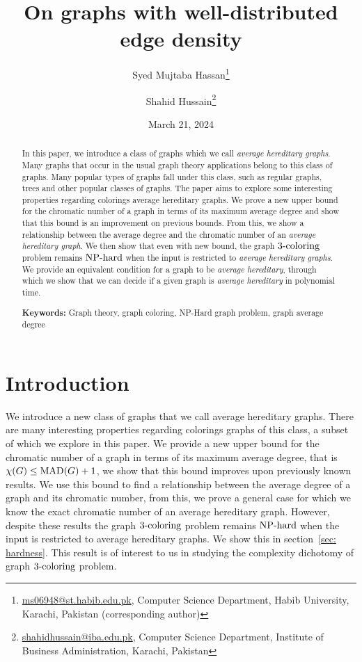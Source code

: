\documentclass{article}
\newcommand{\classX}[1]{\ensuremath{\text{\textsf{\textbf{#1}}}}}
\newcommand{\NPH}{\classX{NP-hard}}
\newcommand{\MAD}{\ensuremath{\text{\textit{MAD}}}}
\newcommand{\Prob}[1]{\ensuremath{\text{\textsc{#1}}}}
\begin{document}
\title{On graphs with well-distributed edge density}
\author{Syed Mujtaba Hassan\footnote{\url{ms06948@st.habib.edu.pk}, Computer Science Department, Habib University, Karachi, Pakistan (corresponding author)} \and Shahid Hussain\footnote{\url{shahidhussain@iba.edu.pk}, Computer Science Department, Institute of Business Administration, Karachi, Pakistan}}
\date{March 21, 2024}
\maketitle


\begin{abstract}
    In this paper, we introduce a class of graphs which we call \emph{average hereditary graphs}. Many graphs that occur in the usual graph theory applications belong to this class of graphs. Many popular types of graphs fall under this class, such as regular graphs, trees and other popular classes of graphs. The paper aims to explore some interesting properties regarding colorings average hereditary graphs. We prove a new upper bound for the chromatic number of a graph in terms of its maximum average degree and show that this bound is an improvement on previous bounds. From this, we show a relationship between the average degree and the chromatic number of an \textit{average hereditary graph}. We then show that even with new bound, the graph \Prob{3-coloring} problem remains $\NPH$ when the input is restricted to \emph{average hereditary graphs}. We provide an equivalent condition for a graph to be \textit{average hereditary}, through which we show that we can decide if a given graph is \textit{average hereditary} in polynomial time. \smallskip

    \noindent\textbf{Keywords:} Graph theory, graph coloring, NP-Hard graph problem, graph average degree
\end{abstract}


\renewcommand\thefootnote{}


\renewcommand\thefootnote{\fnsymbol{footnote}}
\setcounter{footnote}{1}
\section{Introduction}\label{sec: intro}
We introduce a new class of graphs that we call average hereditary graphs. There are many interesting properties regarding colorings graphs of this class, a subset of which we explore in this paper. We provide a new upper bound for the chromatic number of a graph in terms of its maximum average degree, that is $\chi(G) \leq \MAD(G) + 1$, we show that this bound improves upon previously known results. We use this bound to find a relationship between the average degree of a graph and its chromatic number, from this, we prove a general case for which we know the exact chromatic number of an average hereditary graph. However, despite these results the graph \Prob{3-coloring} problem remains $\NPH$ when the input is restricted to average hereditary graphs. We show this in section~\ref*{sec: hardness}. This result is of interest to us in studying the complexity dichotomy of graph \Prob{3-coloring} problem.
\end{document}
